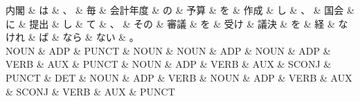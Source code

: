 \documentclass[tikz,border=5pt]{standalone}
\begin{document}
\normalsize
\begin{dependency}[edge unit distance=12.0pt]
    \begin{deptext}[column sep=1em]
        内閣 \& は \& 、 \& 毎 \& 会計年度 \& の \& 予算 \& を \& 作成 \& し \& 、 \& 国会 \& に \& 提出 \& し \& て \& 、 \& その \& 審議 \& を \& 受け \& 議決 \& を \& 経 \& なけれ \& ば \& なら \& ない \& 。\\
        NOUN \& ADP \& PUNCT \& NOUN \& NOUN \& ADP \& NOUN \& ADP \& VERB \& AUX \& PUNCT \& NOUN \& ADP \& VERB \& AUX \& SCONJ \& PUNCT \& DET \& NOUN \& ADP \& VERB \& NOUN \& ADP \& VERB \& AUX \& SCONJ \& VERB \& AUX \& PUNCT\\
    \end{deptext}
\end{dependency}
\end{document}
